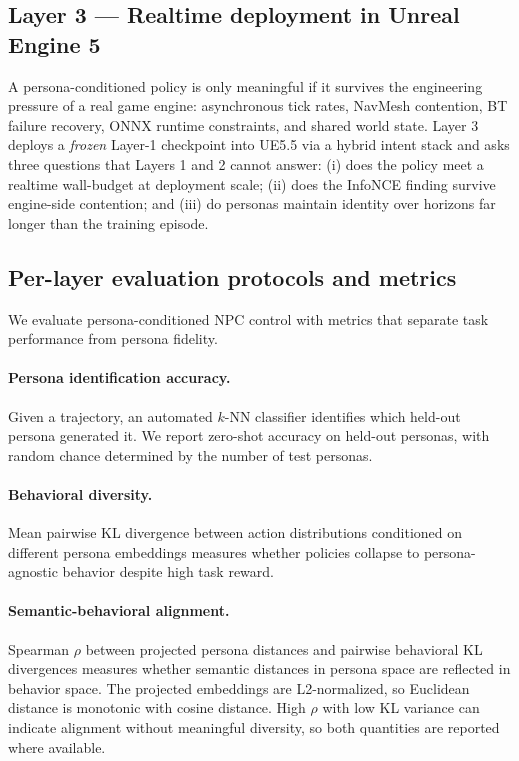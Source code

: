 \documentclass[conference]{IEEEtran}
\begin{document}
\subsection{Layer 3 — Realtime deployment in Unreal Engine 5}
\label{sec:layer3env}

A persona-conditioned policy is only meaningful if it survives the
engineering pressure of a real game engine: asynchronous tick rates, NavMesh
contention, BT failure recovery, ONNX runtime constraints, and shared world
state. Layer 3 deploys a \emph{frozen} Layer-1 checkpoint into UE5.5 via a
hybrid intent stack and asks three questions that Layers 1 and 2 cannot
answer: (i) does the policy meet a realtime wall-budget at deployment scale;
(ii) does the InfoNCE finding survive engine-side contention; and (iii) do
personas maintain identity over horizons far longer than the training episode.

\subsection{Per-layer evaluation protocols and metrics}
\label{sec:evalprotocol}

We evaluate persona-conditioned NPC control with metrics that separate task
performance from persona fidelity.

\paragraph{Persona identification accuracy.}
Given a trajectory, an automated $k$-NN classifier identifies which held-out
persona generated it. We report zero-shot accuracy on held-out personas, with
random chance determined by the number of test personas.

\paragraph{Behavioral diversity.}
Mean pairwise KL divergence between action distributions conditioned on different
persona embeddings measures whether policies collapse to persona-agnostic
behavior despite high task reward.

\paragraph{Semantic-behavioral alignment.}
Spearman $\rho$ between projected persona distances and pairwise behavioral KL
divergences measures whether semantic distances in persona space are reflected
in behavior space. The projected embeddings are L2-normalized, so Euclidean
distance is monotonic with cosine distance. High $\rho$ with low KL variance can
indicate alignment without meaningful diversity, so both quantities are reported
where available.
\end{document}
